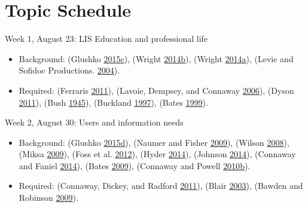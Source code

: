 \documentclass[]{article}
\providecommand{\tightlist}{%
  \setlength{\itemsep}{0pt}\setlength{\parskip}{0pt}}
\begin{document}
\section{Topic Schedule}\label{topic-schedule}

Week 1, August 23: LIS Education and professional life

\begin{itemize}
\tightlist
\item
  Background: (Glushko
  \protect\hyperlink{ref-glushkoux5ffoundationux5f2015}{2015}\protect\hyperlink{ref-glushkoux5ffoundationux5f2015}{c}),
  (Wright
  \protect\hyperlink{ref-wrightux5fsecretux5f2014}{2014}\protect\hyperlink{ref-wrightux5fsecretux5f2014}{b}),
  (Wright
  \protect\hyperlink{ref-wrightux5fcatalogingux5f2014}{2014}\protect\hyperlink{ref-wrightux5fcatalogingux5f2014}{a}),
  (Levie and Sofidoc Productions.
  \protect\hyperlink{ref-levieux5fmanux5f2004}{2004}).
\item
  Required: (Ferraris
  \protect\hyperlink{ref-ferrarisux5fsocialux5f2011}{2011}), (Lavoie,
  Dempsey, and Connaway
  \protect\hyperlink{ref-lavoieux5fmakingux5f2006}{2006}), (Dyson
  \protect\hyperlink{ref-dysonux5fhowux5f2011}{2011}), (Bush
  \protect\hyperlink{ref-bushux5fasux5f1945}{1945}), (Buckland
  \protect\hyperlink{ref-bucklandux5fwhatux5f1997}{1997}), (Bates
  \protect\hyperlink{ref-batesux5finvisibleux5f1999}{1999}).
\end{itemize}

Week 2, August 30: Users and information needs

\begin{itemize}
\tightlist
\item
  Background: (Glushko
  \protect\hyperlink{ref-glushkoux5finteractionsux5f2015}{2015}\protect\hyperlink{ref-glushkoux5finteractionsux5f2015}{d}),
  (Naumer and Fisher
  \protect\hyperlink{ref-naumerux5finformationux5f2009}{2009}), (Wilson
  \protect\hyperlink{ref-wilsonux5finformationux5f2008}{2008}), (Miksa
  \protect\hyperlink{ref-miksaux5finformationux5f2009}{2009}), (Foss et
  al. \protect\hyperlink{ref-fossux5fchildrensux5f2012}{2012}), (Hyder
  \protect\hyperlink{ref-hyderux5freadingux5f2014}{2014}), (Johnson
  \protect\hyperlink{ref-johnsonux5fhealth-relatedux5f2014}{2014}),
  (Connaway and Faniel
  \protect\hyperlink{ref-connawayux5freorderingux5f2014}{2014}), (Bates
  \protect\hyperlink{ref-batesux5finformationux5f2009}{2009}), (Connaway
  and Powell
  \protect\hyperlink{ref-connawayux5fselectingux5f2010}{2010}\protect\hyperlink{ref-connawayux5fselectingux5f2010}{b}).
\item
  Required: (Connaway, Dickey, and Radford
  \protect\hyperlink{ref-connawayux5fifux5f2011}{2011}), (Blair
  \protect\hyperlink{ref-blairux5freadingux5f2003}{2003}), (Bawden and
  Robinson \protect\hyperlink{ref-bawdenux5fdarkux5f2009}{2009}).
\end{itemize}
\end{document}
